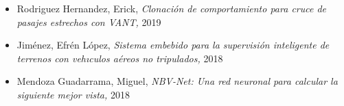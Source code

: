 \begin{itemize} 
\item Rodriguez Hernandez, Erick, \textit{ Clonaci\'on de comportamiento para cruce de pasajes estrechos con VANT,} 2019 
\item Jim{\'e}nez, Efr{\'e}n L{\'o}pez, \textit{ Sistema embebido para la supervisi{\'o}n inteligente de terrenos con veh{\i}culos a{\'e}reos no tripulados,} 2018 
\item Mendoza Guadarrama, Miguel, \textit{ NBV-Net: Una red neuronal para calcular la siguiente mejor vista,} 2018 
\end{itemize} 
